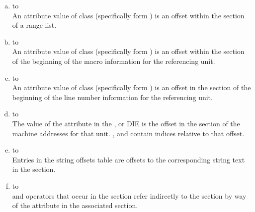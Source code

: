 \begin{enumerate}[(a)]
\item \dotdebuginfo{} to \dotdebugranges \\
An attribute value of class  
(specifically form
\DWFORMsecoffset) 
is an offset within the \dotdebugranges{} section of
a range list.

\item \dotdebuginfo{} to \dotdebugmacro \\
An attribute value of class 
 (specifically form
\DWFORMsecoffset) is an 
offset within the 
\dotdebugmacro{} section
of the beginning of the macro information for the referencing unit.

\item \dotdebuginfo{} to \dotdebugline \\
An attribute value of class 
 (specifically form
\DWFORMsecoffset) 
is an offset in the 
\dotdebugline{} section of the
beginning of the line number information for the referencing unit.

\item \dotdebuginfo{} to \dotdebugaddr \\
The value of the \DWATaddrbase{} attribute in the
\DWTAGcompileunit{}, \DWTAGtypeunit{} or \DWTAGpartialunit{} DIE is the
offset in the \dotdebugaddr{} section of the machine
addresses for that unit.
\DWFORMaddrx, \DWOPaddrx{} and \DWOPconstx{} contain
indices relative to that offset.

\item \dotdebugstroffsets{} to \dotdebugstr \\
Entries in the string offsets table
are offsets to the corresponding string text in the 
\dotdebugstr{} section.

\item \dotdebugloc{} to \dotdebugaddr \\
\DWOPaddrx{} and \DWOPconstx{} operators that occur in the 
\dotdebugloc{} section refer indirectly to the 
\dotdebugaddr{} section by way of the 
\DWATaddrbase{} attribute in the associated \dotdebuginfo{} 
section. 
\end{enumerate}
